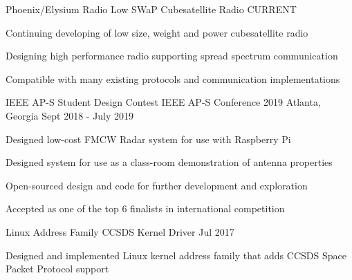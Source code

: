 

\begin{cventries}

    \cventry
    {Phoenix/Elysium Radio} %
    {Low SWaP Cubesatellite Radio} %
    {} %
    {CURRENT} %
    {
        \begin{cvitems} %
        \item {Continuing developing of low size, weight and power cubesatellite radio}
        \item {Designing high performance radio supporting spread spectrum communication}
        \item {Compatible with many existing protocols and communication implementations}
        \end{cvitems}
    }

    \cventry
    {IEEE AP-S Student Design Contest}
    {IEEE AP-S Conference 2019}
    {Atlanta, Georgia}
    {Sept 2018 - July 2019}
    {
        \begin{cvitems}
        \item {Designed low-cost FMCW Radar system for use with Raspberry Pi}
        \item {Designed system for use as a class-room demonstration of antenna properties}
        \item {Open-sourced design and code for further development and exploration}
        \item {Accepted as one of the top 6 finalists in international competition}
        \end{cvitems}
    }

    \cventry
    {Linux Address Family} %
    {CCSDS Kernel Driver} %
    {} %
    {Jul 2017} %
    {
        \begin{cvitems} %
        \item {Designed and implemented Linux kernel address family that adds CCSDS Space Packet Protocol support}
        \end{cvitems}
    }

\end{cventries}
